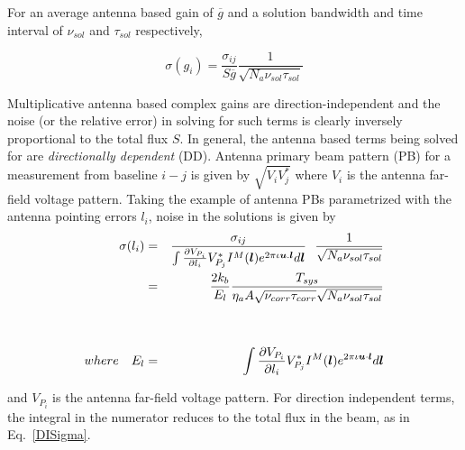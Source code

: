 \documentclass[11pt]{article}
\def\vec#1{\ensuremath{\mathchoice{\mbox{\boldmath$\displaystyle#1$}}
{\mbox{\boldmath$\textstyle#1$}}
{\mbox{\boldmath$\scriptstyle#1$}}
{\mbox{\boldmath$\scriptscriptstyle#1$}}}}
\begin{document}
For an average antenna based gain of $\overline{g}$ and a solution
bandwidth and time interval of $\nu_{sol}$ and $\tau_{sol}$
respectively,

\begin{equation}
\label{DISigma}
\sigma(g_i) = \frac{\sigma_{ij}}{S \overline{g}}\frac{1}{\sqrt{N_a \nu_{sol} \tau_{sol}}}
\end{equation}

Multiplicative antenna based complex gains are direction-independent
and the noise (or the relative error) in solving for such terms is
clearly inversely proportional to the total flux $S$. In general, the
antenna based terms being solved for are {\it directionally dependent}
(DD).  Antenna primary beam pattern (PB) for a measurement from
baseline $i-j$ is given by $\sqrt{V_i V_j^*}$ where $V_i$ is the
antenna far-field voltage pattern.  Taking the example of antenna PBs
parametrized with the antenna pointing errors $l_i$, noise in the
solutions is given by
\begin{eqnarray}
\label{DDSigma1}
\sigma(l_i) &=& \frac{\sigma_{ij}}{\int \frac{\partial V_{P_i}}{\partial l_i} V^*_{P_j} I^M(\vec{l}) e^{2
    \pi \iota \vec{u}.\vec{l}} d\vec{l}}~~\frac{1}{\sqrt{N_a
    \nu_{sol}\tau_{sol}}}\\
\label{DDSigma2}
&=& \frac{2 k_b}{E_l}\frac{T_{sys}}{\eta_a A\sqrt{\nu_{corr}\tau_{corr}}
  \sqrt{N_a \nu_{sol} \tau_{sol}}}\\\nonumber
\\ \nonumber
\\
where~~~E_l &=& \int \frac{\partial V_{P_i}}{\partial l_i} V^*_{P_j} I^M(\vec{l}) e^{2
    \pi \iota \vec{u}\cdot \vec{l}} d\vec{l}
\end{eqnarray}

and $V_{P_i}$ is the antenna far-field voltage pattern.  For direction
independent terms, the integral in the numerator reduces to the total
flux in the beam, as in Eq.~\ref{DISigma}.
\end{document}

